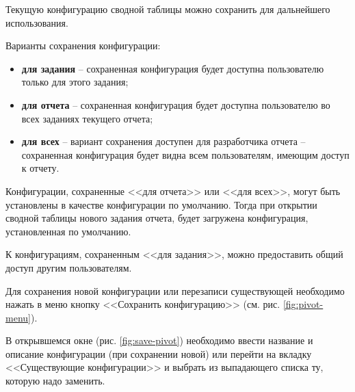 \documentclass[../user-manual.tex]{subfiles}
\begin{document}
	
	Текущую конфигурацию сводной таблицы можно сохранить для дальнейшего использования.
	
	Варианты сохранения конфигурации:
	
	\begin{itemize}
		
		\item \textbf{для задания} -- сохраненная конфигурация будет доступна пользователю только для этого задания;
		
		\item \textbf{для отчета} -- сохраненная конфигурация будет доступна пользователю во всех заданиях текущего отчета;
		
		\item \textbf{для всех} -- вариант сохранения доступен для разработчика отчета -- сохраненная конфигурация будет видна всем пользователям, имеющим доступ к отчету.
		
	\end{itemize}

	Конфигурации, сохраненные <<для отчета>> или <<для всех>>, могут быть установлены в качестве конфигурации по умолчанию. Тогда при открытии сводной таблицы нового задания отчета, будет загружена конфигурация, установленная по умолчанию.
	
	К конфигурациям, сохраненным <<для задания>>, можно предоставить общий доступ другим пользователям.
	
	Для сохранения новой конфигурации или перезаписи существующей необходимо нажать в меню кнопку <<Сохранить конфигурацию>> (см. рис. \ref{fig:pivot-menu}).
	
	В открывшемся окне (рис. \ref{fig:save-pivot}) необходимо ввести название и описание конфигурации (при сохранении новой) или перейти на вкладку <<Существующие конфигурации>> и выбрать из выпадающего списка ту, которую надо заменить.
	
\end{document}
